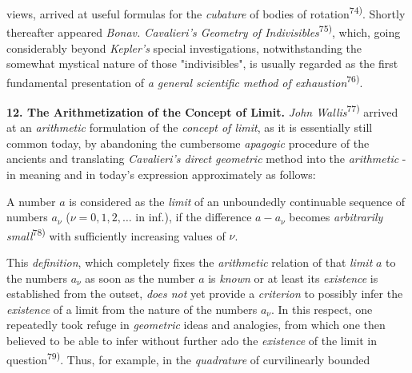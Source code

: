 \thispagestyle{fancy}

\vspace{0.5cm}

views, arrived at useful formulas for the \textit{cubature} of bodies of rotation\textsuperscript{74)}. Shortly thereafter appeared \textit{Bonav. Cavalieri's Geometry of Indivisibles}\textsuperscript{75)}, which, going considerably beyond \textit{Kepler's} special investigations, notwithstanding the somewhat mystical nature of those "indivisibles", is usually regarded as the first fundamental presentation of \textit{a general scientific method of exhaustion}\textsuperscript{76)}.

\vspace{0.5cm}

\textbf{12. The Arithmetization of the Concept of Limit.} \textit{John Wallis}\textsuperscript{77)} arrived at an \textit{arithmetic} formulation of the \textit{concept of limit}, as it is essentially still common today, by abandoning the cumbersome \textit{apagogic} procedure of the ancients and translating \textit{Cavalieri's direct geometric} method into the \textit{arithmetic} - in meaning and in today's expression approximately as follows:

A number $a$ is considered as the \textit{limit} of an unboundedly continuable sequence of numbers $a_\nu$ ($\nu = 0, 1, 2, \ldots$ in inf.), if the difference $a - a_\nu$ becomes \textit{arbitrarily small}\textsuperscript{78)} with sufficiently increasing values of $\nu$.

This \textit{definition}, which completely fixes the \textit{arithmetic} relation of that \textit{limit} $a$ to the numbers $a_\nu$ as soon as the number $a$ is \textit{known} or at least its \textit{existence} is established from the outset, \textit{does not} yet provide a \textit{criterion} to possibly infer the \textit{existence} of a limit from the nature of the numbers $a_\nu$. In this respect, one repeatedly took refuge in \textit{geometric} ideas and analogies, from which one then believed to be able to infer without further ado the \textit{existence} of the limit in question\textsuperscript{79)}. Thus, for example, in the \textit{quadrature} of curvilinearly bounded 

